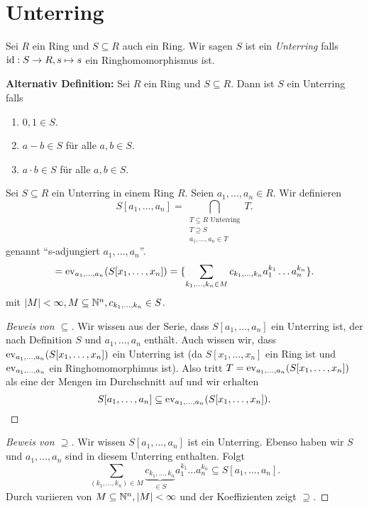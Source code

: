\section{Unterring}
\begin{definition}
	Sei $R$ ein Ring und $S \subseteq R$ auch ein Ring. Wir sagen $S$ ist ein \emph{Unterring} falls $\operatorname{id}: S \to R, s \mapsto s$ 
	ein Ringhomomorphismus ist.
	
	\textbf{Alternativ Definition:}
	Sei $R$ ein Ring und $S \subseteq R$. Dann ist $S$ ein Unterring falls
	\begin{enumerate}
		\item $0,1 \in S$.
		\item $a-b \in S$ für alle $a,b \in S$.
		\item $a\cdot b \in S$ für alle $a,b \in S$.
	\end{enumerate}
\end{definition}

\begin{notation}
	Sei $S \subseteq R$ ein Unterring in einem Ring $R$.
	Seien $a_1,\ldots,a_{n} \in R$. Wir definieren
	\[
		S[a_1,\ldots,a_{n}] = \bigcap_{\substack{T \subseteq R \text{ Unterring}\\ T \supseteq S\\ a_1,\ldots,a_{n} \in T}} T 
	.\] 
	genannt \enquote{s-adjungiert $a_1,\ldots,a_{n}$}.
	\[
	= \operatorname{ev}_{a_1,\ldots,a_{n}}(S[x_1,\ldots,x_{n}]) = \{\sum_{k_1,\ldots,k_{n} \in M} c_{k_1,\ldots,k_{n}} a_1^{k_1} \ldots a_{n}^{k_{n}} \} 
	.\] 
	mit $\abs{M} < \infty, M \subseteq \mathbb{N}^{n}, c_{k_1,\ldots,k_{n}} \in S$.
\end{notation}

\begin{proof}[Beweis von $\subseteq$]
	Wir wissen aus der Serie, dass $S[a_1,\ldots,a_{n}]$ ein Unterring ist, der nach Definition $S$ und $a_1,\ldots,a_{n}$ enthält.
	Auch wissen wir, dass $\operatorname{ev}_{a_1,\ldots,a_{n}}(S[x_1,\ldots,x_{n}])$ ein Unterring ist (da $S[x_1,\ldots,x_{n}]$ ein Ring ist und $\operatorname{ev}_{a_1,\ldots,a_{n}}$ ein Ringhomomorphimus ist).
	Also tritt $T = \operatorname{ev}_{a_1,\ldots,a_{n}}(S[x_1,\ldots,x_{n}])$ als eine der Mengen im Durchschnitt auf und wir erhalten
	\[
		S[a_1,\ldots,a_{n}] \subseteq \operatorname{ev}_{a_1,\ldots,a_{n}}(S[x_1,\ldots,x_{n}])
	.\] 
\end{proof}

\begin{proof}[Beweis von $\supseteq$]
	Wir wissen $S[a_1,\ldots,a_{n}]$ ist ein Unterring.
	Ebenso haben wir $S$ und $a_1,\ldots,a_{n}$ sind in diesem Unterring enthalten. Folgt
	\[
		\sum_{(k_1,\ldots,k_{n}) \in M} \underbrace{c_{k_1,\ldots,k_{n}}}_{\in S} a_1^{k_1} \ldots a_{n}^{k_{n}} \subseteq S[a_1,\ldots,a_{n}]
	.\] 
	Durch variieren von $M \subseteq \mathbb{N}^{n}, \abs{M} < \infty$ und der Koeffizienten zeigt $\supseteq$.
\end{proof}

